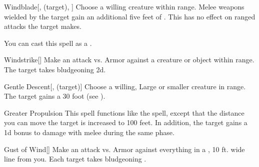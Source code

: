 \lowercase{\hypertarget{spell:Windblade}{}}\label{spell:Windblade}
\begin{ability}[\nth{1}]{\hypertarget{spell:Windblade}{Windblade}}[,  (target), ]
Choose a willing creature within \rngclose range.
Melee weapons wielded by the target gain an additional five feet of .
This has no effect on ranged attacks the target makes.

You can cast this spell as a .
\end{ability}
\vspace{0.25em}



\lowercase{\hypertarget{spell:Windstrike}{}}\label{spell:Windstrike}
\begin{ability}[\nth{1}]{\hypertarget{spell:Windstrike}{Windstrike}}[]
Make an attack vs. Armor against a creature or object within \rngmed range.
\hit The target takes bludgeoning  \plus2d.
\end{ability}
\vspace{0.25em}



\lowercase{\hypertarget{spell:Gentle Descent}{}}\label{spell:Gentle Descent}
\begin{ability}[\nth{2}]{\hypertarget{spell:Gentle Descent}{Gentle Descent}}[,  (target)]
Choose a willing, Large or smaller creature in \rngclose range.
The target gains a 30 foot  (see ).
\end{ability}
\vspace{0.25em}



\lowercase{\hypertarget{spell:Greater Propulsion}{}}\label{spell:Greater Propulsion}
\begin{ability}[\nth{2}]{\hypertarget{spell:Greater Propulsion}{Greater Propulsion}}
This spell functions like the  spell, except that the distance you can move the target is increased to 100 feet.
In addition, the target gains a \plus1d bonus to damage with melee  during the same phase.
\end{ability}
\vspace{0.25em}



\lowercase{\hypertarget{spell:Gust of Wind}{}}\label{spell:Gust of Wind}
\begin{ability}[\nth{2}]{\hypertarget{spell:Gust of Wind}{Gust of Wind}}[]
Make an attack vs. Armor against everything in a \arealarge, 10 ft. wide line from you.
\hit Each target takes bludgeoning .
\end{ability}
\vspace{0.25em}



